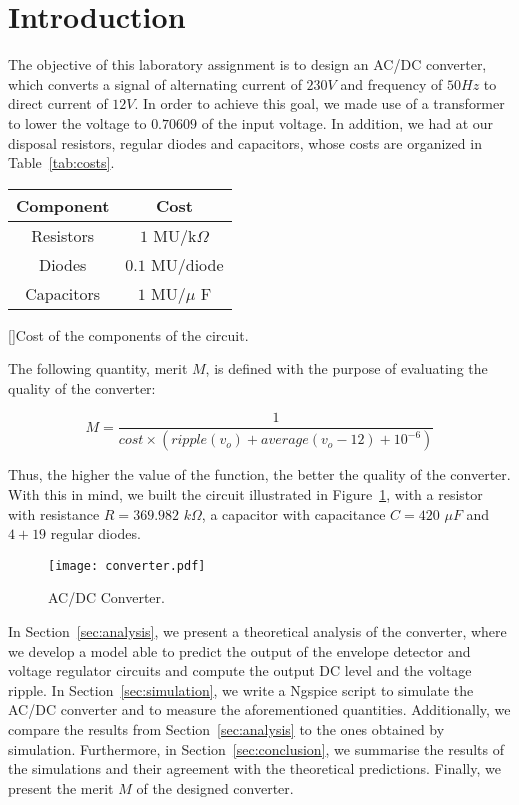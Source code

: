 \section{Introduction}
\label{sec:introduction}

The objective of this laboratory assignment is to design an AC/DC converter, which converts a signal of alternating current of $230V$ and frequency of $50 Hz$ to direct current of $12V$. In order to achieve this goal, we made use of a transformer to lower the voltage to $0.70609$ of the input voltage. In addition, we had at our disposal resistors, regular diodes and capacitors, whose costs are organized in Table~\ref{tab:costs}.

\begin{center}
\begin{tabular}{ | c | c | }\label{tab:costs}
Component & Cost \\
\hline
Resistors & $1$ MU/k$\Omega$ \\ 
Diodes & $0.1$ MU/diode \\  
Capacitors & $1$ MU/$\mu$ F    
\end{tabular}
[]{Cost of the components of the circuit.}
\end{center}

The following quantity, merit $M$, is defined with the purpose of evaluating the quality of the converter:

\begin{equation}
  M = \frac{1}{cost \times (ripple(v_o) + average(v_o-12) + 10^{-6})}
\end{equation}

Thus, the higher the value of the function, the better the quality of the converter.\\

With this in mind, we built the circuit illustrated in Figure~\ref{fig:converter}, with a resistor with resistance $R = 369.982$ $k\Omega$, a capacitor with capacitance $C = 420$ $\mu F$ and $4+19$ regular diodes.

\begin{figure}[H] \centering
\texttt{[image: converter.pdf]}
\caption{AC/DC Converter.}
\label{fig:converter}
\end{figure}

In Section~\ref{sec:analysis}, we present a theoretical analysis of the converter, where we develop a model able to predict the output of the envelope detector and voltage regulator circuits and compute the output DC level and the voltage ripple. In Section~\ref{sec:simulation}, we write a Ngspice script to simulate the AC/DC converter and to measure the aforementioned quantities. Additionally, we compare the results from Section~\ref{sec:analysis} to the ones obtained by simulation. Furthermore, in Section~\ref{sec:conclusion}, we summarise the results of the simulations and their agreement with the theoretical predictions. Finally, we present the merit $M$ of the designed converter.

